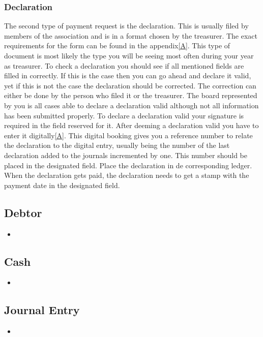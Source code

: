 \documentclass{report}
\begin{document}
\subsubsection{Declaration}
The second type of payment request is the declaration. This is usually filed by members of the association and is in a format chosen by the treasurer. The exact requirements for the form can be found in the appendix\ref{A}. This type of document is most likely the type you will be seeing most often during your year as treasurer. To check a declaration you should see if all mentioned fields are filled in correctly. If this is the case then you can go ahead and declare it valid, yet if this is not the case the declaration should be corrected. The correction can either be done by the person who filed it or the treasurer. The board represented by you is all cases able to declare a declaration valid although not all information has been submitted properly. To declare a declaration valid your signature is required in the field reserved for it. After deeming a declaration valid you have to enter it digitally\ref{A}. This digital booking gives you a reference number to relate the declaration to the digital entry, usually being the number of the last declaration added to the journals incremented by one. This number should be placed in the designated field. Place the declaration in de corresponding ledger. When the declaration gets paid, the declaration needs to get a stamp with the payment date in the designated field.        

\subsection{Debtor}
\begin{itemize} 
\vspace{-1mm}
\itemsep-1mm 
\item 
\end{itemize}

\subsection{Cash}
\begin{itemize} 
\vspace{-1mm}
\itemsep-1mm 
\item 
\end{itemize}

\subsection{Journal Entry}
\begin{itemize} 
\vspace{-1mm}
\itemsep-1mm 
\item 
\end{itemize}
\end{document}
